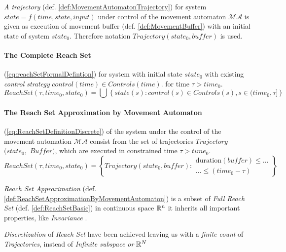     
    \begin{definition}\label{def:ReachSetApproximationByMovementAutomaton}
        \emph{A trajectory} (def. \ref{def:MovementAutomatonTrajectory}) for system $\dot{state}=f(time,state,input)$ under control of the movement automaton $\mathscr{MA}$ is given as execution of movement buffer (def. \ref{def:MovementBuffer}) with an initial state of system $state_0$.  Therefore notation $Trajectory(state_0,buffer)$ is used.
    
        
        \paragraph{The Complete Reach Set} (\ref{eq:reachSetFormalDefintion}) for system with initial state $state_0$ with existing \emph{control strategy} $control(time)\in Controls(time)$. for time  $\tau > time_0$.
        \begin{equation}\label{eq:reachSetFormalDefintion}
            ReachSet(\tau,time_0,state_0) = \bigcup \left\{state(s):control(s)\in Controls(s), s\in (time_0,\tau]\right\} 
        \end{equation}
        
        
        \paragraph{The Reach Set Approximation by Movement Automaton} (\ref{eq:ReachSetDefinitionDiscrete}) of the system under the control of the movement automation $\mathscr{MA}$ consist from the set of trajectories $Trajectory$ $(state_0,$ $Buffer)$, which are executed in constrained time $\tau > time_0$.
        \begin{equation}\label{eq:ReachSetDefinitionDiscrete}
             ReachSet(\tau,time_0,state_0)=\left\{Trajectory(state_0,buffer):
             \begin{gathered}
                \text{duration}(buffer)\le\dots\\\dots\le (time_0-\tau)
             \end{gathered}\right\}
        \end{equation}
    \end{definition}
    
    \begin{note}
        \emph{Reach Set Approximation} (def. \ref{def:ReachSetApproximationByMovementAutomaton}) is a subset of \emph{Full Reach Set} (def. \ref{def:ReachSetBasic}) in continuous space $\mathbb{R}^n$ it inherits all important properties, like \emph{Invariance} \cite{blanchini1999set}.
        
        \emph{Discretization} of \emph{Reach Set} have been achieved leaving us with a \emph{finite count} of \emph{Trajectories}, instead of \emph{Infinite subspace or $\mathbb{R}^N$}
    \end{note}

